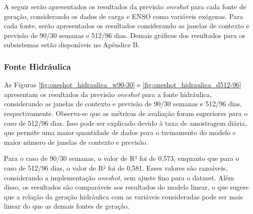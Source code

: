 A seguir serão apresentados os resultados da previsão \textit{oneshot} para cada fonte de geração, considerando os dados de carga e ENSO
como variáveis exógenas. Para cada fonte, serão apresentados os resultados considerando as janelas de contexto e previsão
de 90/30 semanas e 512/96 dias. Demais gráficos dos resultados para os subsistemas estão disponíveis no Apêndice B.

\subsubsection{Fonte Hidráulica}
\begin{figure}[!ht]
  {}
  {}
\end{figure}
\begin{figure}[!ht]
  {}
  {}
\end{figure}
As Figuras \ref{fig:oneshot_hidraulica_w90-30} e \ref{fig:oneshot_hidraulica_d512-96} apresentam os resultados da previsão
\textit{oneshot} para a fonte hidráulica, considerando as janelas de contexto e previsão de 90/30 semanas e 512/96 dias, respectivamente.
Observa-se que as métricas de avaliação foram superiores para o caso de 512/96 dias. Isso pode ser explicado devido à
taxa de amostragem diária, que permite uma maior quantidade de dados para o treinamento do modelo e maior número de 
janelas de contexto e previsão.

Para o caso de 90/30 semanas, o valor de R² foi de 0,573, enquanto que para o caso de 512/96 dias, o valor de R² foi de 0,581.
Esses valores são razoáveis, considerando a implementação \textit{oneshot}, sem ajuste fino para o dataset. Além disso, os
resultados são comparáveis aos resultados do modelo linear, o que sugere que a relação da geração hidráulica com as variáveis 
consideradas pode ser mais linear do que as demais fontes de geração.

